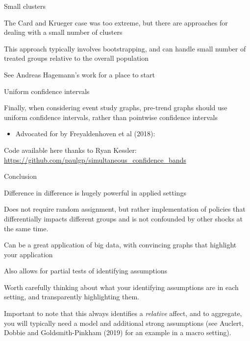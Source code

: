 \documentclass[notes,11pt, aspectratio=169]{beamer}
\newenvironment{wideitemize}{\itemize\addtolength{\itemsep}{10pt}}{\enditemize}
\begin{document}
\begin{frame}{Small clusters}
  \begin{wideitemize}
  \item The Card and Krueger case was too extreme, but there are approaches for dealing with a small number of clusters
  \item This approach typically involves  bootstrapping, and can handle small number of treated groups relative to the overall population
  \item See Andreas Hagemann's work for a place to start
  \end{wideitemize}
\end{frame}

\begin{frame}{Uniform confidence intervals}
  \begin{wideitemize}
  \item Finally, when considering event study graphs, pre-trend graphs
    should use uniform confidence intervals, rather than pointwise confidence intervals
    \begin{itemize}
    \item Advocated for by Freyaldenhoven et al (2018):
    \end{itemize}
  \item Code available here thanks to Ryan Kessler: \url{https://github.com/paulgp/simultaneous_confidence_bands}
    \begin{center}
    \end{center}
  \end{wideitemize}
\end{frame}


\begin{frame}{Conclusion}
  \begin{wideitemize}
  \item Difference in difference is hugely powerful in applied settings
  \item Does not require random assignment, but rather implementation
    of policies that differentially impacts different groups and is
    not confounded by other shocks at the same time.
  \item Can be a great application of big data, with convincing graphs
    that highlight your application
  \item Also allows for partial tests of identifying assumptions
  \item Worth carefully thinking about what your identifying
    assumptions are in each setting, and transparently highlighting
    them.
  \item Important to note that this always identifies a
    \emph{relative} affect, and to aggregate, you will typically need
    a model and additional strong assumptions (see Auclert, Dobbie and
    Goldsmith-Pinkham (2019) for an example in a macro setting).
  \end{wideitemize}
\end{frame}
\end{document}
